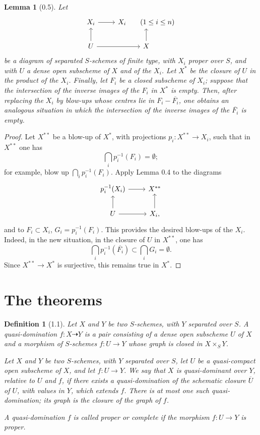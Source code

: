 \documentclass[11pt]{article}
\newtheorem*{lemma}{Lemma}
\newtheorem*{definition}{Definition}
\begin{document}
\begin{lemma}[0.5]
Let
\[
\begin{tikzcd}
X_i \ar[r] & X_i \qquad (1\le i\le n) \\
U \ar[u] \ar[r] & X \ar[u]
\end{tikzcd}
\]
be a diagram of separated \(S\)-schemes of finite type, with \(X_i\) proper over \(S\), and with \(U\) a dense open subscheme of \(X\) and of the \(X_i\). Let \(X^*\) be the closure of \(U\) in the product of the \(X_i\). Finally, let \(F_i\) be a closed subscheme of \(X_i\); suppose that the intersection of the inverse images of the \(F_i\) in \(X^*\) is empty. Then, after replacing the \(X_i\) by blow-ups whose centres lie in \(F_i-\overline{F_i}\), one obtains an analogous situation in which the intersection of the inverse images of the \(\overline{F_i}\) is empty.
\end{lemma}

\begin{proof}
Let \(X^{**}\) be a blow-up of \(X^*\), with projections \(p_i:X^{**}\to X_i\), such that in \(X^{**}\) one has
\[
\bigcap_i p_i^{-1}(F_i)=\emptyset;
\]
for example, blow up \(\bigcap_i p_i^{-1}(F_i)\). Apply Lemma 0.4 to the diagrams
\[
\begin{tikzcd}
p_i^{-1}(X_i) \ar[r] & X^{**} \\
U \ar[u] \ar[r] & X_i, \ar[u]
\end{tikzcd}
\]
and to \(F_i\subset X_i\), \(G_i=p_i^{-1}(F_i)\). This provides the desired blow-ups of the \(X_i\). Indeed, in the new situation, in the closure of \(U\) in \(X^{**}\), one has
\[
\bigcap_i p_i^{-1}(\overline{F_i})\subset \bigcap_i G_i=\emptyset.
\]
Since \(X^{**}\to X^*\) is surjective, this remains true in \(X^*\).
\end{proof}

\section{The theorems}

\begin{definition}[1.1]
Let \(X\) and \(Y\) be two \(S\)-schemes, with \(Y\) separated over \(S\). A \emph{quasi-domination} \(f:X\dashrightarrow Y\) is a pair consisting of a dense open subscheme \(U\) of \(X\) and a morphism of \(S\)-schemes \(f:U\to Y\) whose graph is closed in \(X\times_S Y\).

Let \(X\) and \(Y\) be two \(S\)-schemes, with \(Y\) separated over \(S\), let \(U\) be a quasi-compact open subscheme of \(X\), and let \(f:U\to Y\). We say that \(X\) is quasi-dominant over \(Y\), relative to \(U\) and \(f\), if there exists a quasi-domination of the schematic closure \(\overline U\) of \(U\), with values in \(Y\), which extends \(f\). There is at most one such quasi-domination; its graph is the closure of the graph of \(f\).

A quasi-domination \(f\) is called \emph{proper} or \emph{complete} if the morphism \(f:U\to Y\) is proper.
\end{definition}
\end{document}
